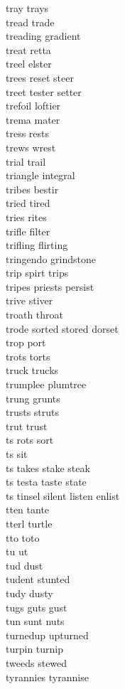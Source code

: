 tray trays \\
tread trade\\
treading gradient\\
treat retta\\
treel elster \\
trees reset steer\\
treet tester setter \\
trefoil loftier\\
trema mater\\
tress rests\\
trews wrest\\
trial trail\\
triangle integral\\
tribes bestir\\
tried tired\\
tries rites\\
trifle filter\\
trifling flirting\\
tringendo grindstone \\
trip spirt trips \\
tripes priests persist \\
trive stiver \\
troath throat\\
trode sorted stored dorset \\
trop port\\
trots torts\\
truck trucks \\
trumplee plumtree\\
trung grunts \\
trusts struts\\
trut trust \\
ts rots sort  \\
ts sit \\
ts takes stake steak   \\
ts testa taste state   \\
ts tinsel silent listen enlist    \\
tten tante \\
tterl turtle \\
tto toto \\
tu ut\\
tud dust \\
tudent stunted \\
tudy dusty \\
tugs guts gust\\
tun sunt nuts \\
turnedup upturned\\
turpin turnip\\
tweeds stewed\\
tyrannies tyrannise\\


